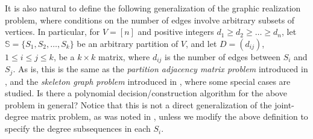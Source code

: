 \documentclass[12pt,a4paper]{article}
\theoremstyle{definition}
\theoremstyle{plain}
\begin{document}
It is also natural to define the following generalization of the graphic realization problem, where conditions on the number of edges
involve arbitrary subsets of vertices.
In particular, for $V= [n]$
and positive integers $d_1 \geq d_2 \geq \ldots \geq d_n$,
let ${\mathbb S}= \{ S_1, S_2 , \ldots , S_k \}$
be an arbitrary partition of $V$,
and let $D\! = \! (d_{ij})$, $1\leq i \leq j \leq k $,
be a $k\times k$ matrix, where $d_{ij}$ is the number of edges between $S_i$ and $S_j$. As is, this is the same as the \emph{partition adjacency matrix problem} introduced in \cite{Ch14}, and the \emph{skeleton graph problem} introduced in \cite{EHIM15}, where some special cases are studied.
Is there a polynomial decision/construction algorithm for the above problem in general?
Notice that this is not a direct generalization of the joint-degree matrix problem, as was noted in \cite{EHIM15}, unless we modify the above definition to specify the degree subsequences in each $S_i$.







\end{document}

